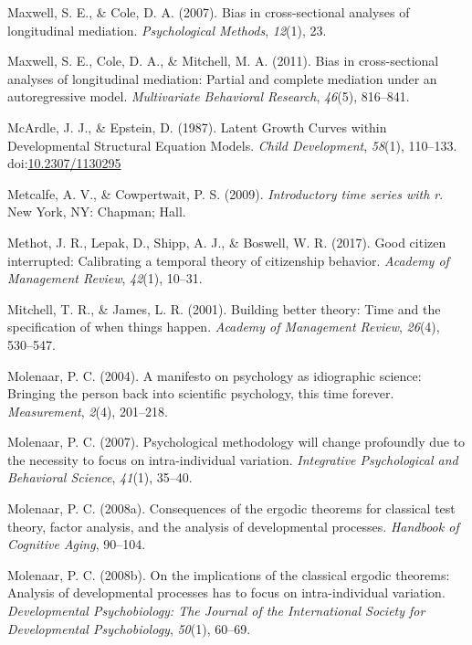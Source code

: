 \documentclass[english,,man]{apa6}
\theoremstyle{definition}
\theoremstyle{definition}
\theoremstyle{definition}
\theoremstyle{remark}
\begin{document}
\leavevmode\hypertarget{ref-maxwell2007bias}{}%
Maxwell, S. E., \& Cole, D. A. (2007). Bias in cross-sectional analyses
of longitudinal mediation. \emph{Psychological Methods}, \emph{12}(1),
23.

\leavevmode\hypertarget{ref-maxwell2011bias}{}%
Maxwell, S. E., Cole, D. A., \& Mitchell, M. A. (2011). Bias in
cross-sectional analyses of longitudinal mediation: Partial and complete
mediation under an autoregressive model. \emph{Multivariate Behavioral
Research}, \emph{46}(5), 816--841.

\leavevmode\hypertarget{ref-mcardle_latent_1987}{}%
McArdle, J. J., \& Epstein, D. (1987). Latent Growth Curves within
Developmental Structural Equation Models. \emph{Child Development},
\emph{58}(1), 110--133.
doi:\href{https://doi.org/10.2307/1130295}{10.2307/1130295}

\leavevmode\hypertarget{ref-metcalfe2009introductory}{}%
Metcalfe, A. V., \& Cowpertwait, P. S. (2009). \emph{Introductory time
series with r}. New York, NY: Chapman; Hall.

\leavevmode\hypertarget{ref-methot2017good}{}%
Methot, J. R., Lepak, D., Shipp, A. J., \& Boswell, W. R. (2017). Good
citizen interrupted: Calibrating a temporal theory of citizenship
behavior. \emph{Academy of Management Review}, \emph{42}(1), 10--31.

\leavevmode\hypertarget{ref-mitchell_building_2001}{}%
Mitchell, T. R., \& James, L. R. (2001). Building better theory: Time
and the specification of when things happen. \emph{Academy of Management
Review}, \emph{26}(4), 530--547.

\leavevmode\hypertarget{ref-molenaar_manifesto_2004}{}%
Molenaar, P. C. (2004). A manifesto on psychology as idiographic
science: Bringing the person back into scientific psychology, this time
forever. \emph{Measurement}, \emph{2}(4), 201--218.

\leavevmode\hypertarget{ref-molenaar2007psychological}{}%
Molenaar, P. C. (2007). Psychological methodology will change profoundly
due to the necessity to focus on intra-individual variation.
\emph{Integrative Psychological and Behavioral Science}, \emph{41}(1),
35--40.

\leavevmode\hypertarget{ref-molenaar2008consequences}{}%
Molenaar, P. C. (2008a). Consequences of the ergodic theorems for
classical test theory, factor analysis, and the analysis of
developmental processes. \emph{Handbook of Cognitive Aging}, 90--104.

\leavevmode\hypertarget{ref-molenaar2008implications}{}%
Molenaar, P. C. (2008b). On the implications of the classical ergodic
theorems: Analysis of developmental processes has to focus on
intra-individual variation. \emph{Developmental Psychobiology: The
Journal of the International Society for Developmental Psychobiology},
\emph{50}(1), 60--69.
\end{document}
